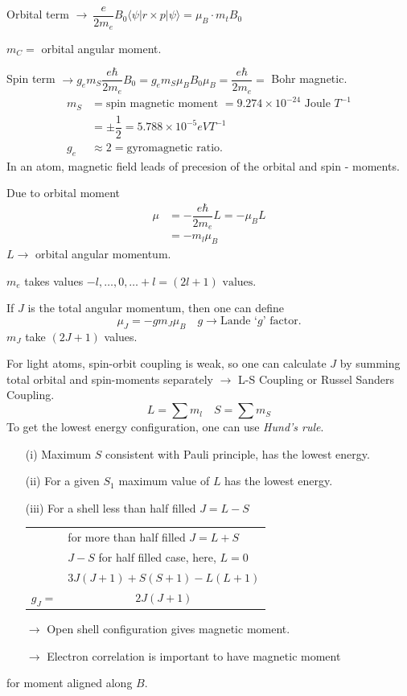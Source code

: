 Orbital term $\to \ \dfrac{e}{2m_{e}}B_{0}\langle \psi |r\times p|\psi\rangle =\mu_{B}\cdot m_{t}B_{0}$

$m_{C}=$ orbital angular moment.

Spin term $\to g_{e}m_{S}\dfrac{e\hbar}{2m_{e}}B_{0}=g_{e}m_{S}\mu_{B}B_{0}\mu_{B}=\dfrac{e\hbar}{2m_{e}}=$ Bohr magnetic.
\begin{align*}
m_{S} &= \text{spin magnetic moment }=9.274\times 10^{-24}\text{ Joule } T^{-1}\\
&= \pm \dfrac{1}{2}=5.788\times 10^{-5}eVT^{-1}\\
g_{e} &\approx 2 = \text{gyromagnetic ratio.}
\end{align*}
In an atom, magnetic field leads of precesion of the orbital and spin - moments.

Due to orbital moment
\begin{align*}
\mu &= -\dfrac{e\hbar}{2m_{e}}L=-\mu_{B}L\\
&= -m_{l}\mu_{B}
\end{align*}
$L\to$ orbital angular momentum.

$m_{e}$ takes values $-l,\ldots,0,\ldots+l=(2l+1)\text{ values}$.

If $J$ is the total angular momentum, then one can define 
$$
\mu_{J}=-gm_{J}\mu_{B}\quad g\to \text{Lande `$g$' factor.}
$$
$m_{J}$ take $(2J+1)$ values.

For light atoms, spin-orbit coupling is weak, so one can calculate $J$ by summing total orbital and spin-moments separately $\to$ L-S Coupling or Russel Sanders Coupling.
$$
L=\sum m_{l}\quad S=\sum m_{S}
$$
To get the lowest energy configuration, one can use {\em Hund's rule}.
\begin{itemize}
\item[(i)] Maximum $S$ consistent with Pauli principle, has the lowest energy.

\item[(ii)] For a given $S_{1}$ maximum value of $L$ has the lowest energy.

\item[(iii)] For a shell less than half filled $J=L-S$
\begin{center}
\begin{tabular}{rl}
 & for more than half filled $J=L+S$\\
 & $J-S$ for half filled case, here, $L=0$\\
 & $3J(J+1)+S(S+1)-L(L+1)$\\
\cline{2-2}
$g_{J}=$ & \multicolumn{1}{c}{$2J(J+1)$}
\end{tabular}
\end{center}
\end{itemize}
\begin{itemize}
\item[$\to$] Open shell configuration gives magnetic moment.

\item[$\to$] Electron correlation is important to have magnetic moment
\end{itemize}
for moment aligned along $B$.


